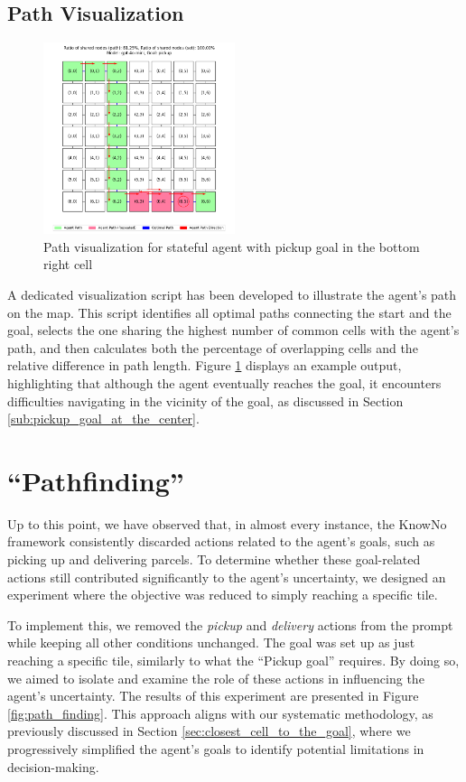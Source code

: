 \subsection{Path Visualization}

\begin{figure}[h]
  \centering
  \includegraphics[width=0.5\textwidth]{
    images/results_discussion/stateful/pickupBR_7x7.png
  }
  \caption{Path visualization for stateful agent with pickup goal in the bottom
  right cell}
  \label{fig:stateful_path}
\end{figure}

A dedicated visualization script has been developed to illustrate the agent's
path on the map. This script identifies all optimal paths connecting the start and
the goal, selects the one sharing the highest number of common cells with the
agent's path, and then calculates both the percentage of overlapping cells and the
relative difference in path length. Figure \ref{fig:stateful_path} displays an
example output, highlighting that although the agent eventually reaches the goal,
it encounters difficulties navigating in the vicinity of the goal, as discussed in
Section \ref{sub:pickup_goal_at_the_center}.

\section{``Pathfinding''}

Up to this point, we have observed that, in almost every instance, the KnowNo framework
consistently discarded actions related to the agent's goals, such as picking up
and delivering parcels. To determine whether these goal-related actions still contributed
significantly to the agent's uncertainty, we designed an experiment where the
objective was reduced to simply reaching a specific tile.

To implement this, we removed the \emph{pickup} and \emph{delivery} actions from
the prompt while keeping all other conditions unchanged. The goal was set up as
just reaching a specific tile, similarly to what the ``Pickup goal'' requires.
By doing so, we aimed to isolate and examine the role of these actions in influencing
the agent's uncertainty. The results of this experiment are presented in Figure
\ref{fig:path_finding}. This approach aligns with our systematic methodology, as
previously discussed in Section \ref{sec:closest_cell_to_the_goal}, where we progressively
simplified the agent's goals to identify potential limitations in decision-making.

